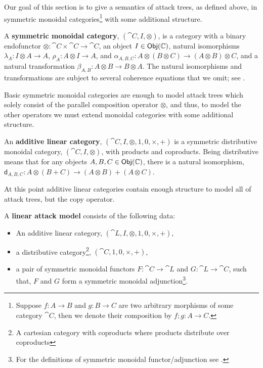\begin{full}
Our goal of this section is to give a semantics of attack trees, as
defined above, in symmetric monoidal categories\footnote{Suppose $f :
  A \to B$ and $g : B \to C$ are two arbitrary morphisms of some
  category $\cat{C}$, then we denote their composition by $f;g : A \to
  C$.} with some additional structure.
\begin{definition}
  \label{def:monoidal-category}
  A \textbf{symmetric monoidal category}, $(\cat{C}, I, \otimes)$, is
  a category with a binary endofunctor $\otimes : \cat{C} \times
  \cat{C} \to \cat{C}$, an object $I \in \mathsf{Obj}(\mathbb{C})$, natural
  isomorphisms $\lambda_A : I \otimes A \to A$, $\rho_A : A \otimes I
  \to A$, and $\alpha_{A,B,C} : A \otimes (B \otimes C) \to (A \otimes
  B) \otimes C$, and a natural transformation $\beta_{A,B} : A \otimes
  B \to B \otimes A$.  The natural isomorphisms and transformations
  are subject to several coherence equations that we omit; see
  \cite{MacLane:1971}.
\end{definition}
Basic symmetric monoidal categories are enough to model attack trees
which solely consist of the parallel composition operator $\otimes$,
and thus, to model the other operators we must extend monoidal
categories with some additional structure.
\begin{definition}
  \label{def:additive-linear-categories}
  An \textbf{additive linear category}, $(\cat{C}, I, \otimes, 1,0,
  \times, +)$ is a symmetric distributive monoidal category,
  $(\cat{C}, I, \otimes)$, with products and coproducts.  Being
  distributive means that for any objects $A,B,C \in \mathsf{Obj}(\mathbb{C})$,
  there is a natural isomorphism, $\mathsf{d}_{A,B,C} : A \otimes (B +
  C) \to (A \otimes B) + (A \otimes C)$.
\end{definition}
At this point additive linear categories contain enough structure to
model all of attack trees, but the copy operator.
\begin{definition}
  \label{def:affine-categories}
  A \textbf{linear attack model} consists of the following data:
  \begin{itemize}
  \item An additive linear category, $(\cat{L}, I, \otimes, 1,0,\times,
  +)$,
  \item a distributive category\footnote{A cartesian category with
    coproducts where products distribute over coproducts}, $(\cat{C},
    1,0,\times, +)$,
  \item a pair of symmetric monoidal functors $F : \cat{C} \to
    \cat{L}$ and $G : \cat{L} \to \cat{C}$, such that, $F$ and $G$
    form a symmetric monoidal adjunction\footnote{For the definitions
      of symmetric monoidal functor/adjunction see
      \cite{Benton:1994}.}.
  \end{itemize}
\end{definition}


\end{full}
